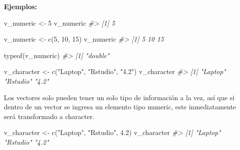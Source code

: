 \documentclass[
]{book}
\newenvironment{Shaded}{\begin{snugshade}}{\end{snugshade}}
\newcommand{\CommentTok}[1]{\textcolor[rgb]{0.56,0.35,0.01}{\textit{#1}}}
\newcommand{\DecValTok}[1]{\textcolor[rgb]{0.00,0.00,0.81}{#1}}
\newcommand{\FloatTok}[1]{\textcolor[rgb]{0.00,0.00,0.81}{#1}}
\newcommand{\FunctionTok}[1]{\textcolor[rgb]{0.00,0.00,0.00}{#1}}
\newcommand{\NormalTok}[1]{#1}
\newcommand{\OtherTok}[1]{\textcolor[rgb]{0.56,0.35,0.01}{#1}}
\newcommand{\StringTok}[1]{\textcolor[rgb]{0.31,0.60,0.02}{#1}}
\begin{document}
\textbf{Ejemplos:}

\begin{Shaded}
\begin{Highlighting}[]
\NormalTok{v\_numeric }\OtherTok{\textless{}{-}} \DecValTok{5}
\NormalTok{v\_numeric}
\CommentTok{\#\textgreater{} [1] 5}
\end{Highlighting}
\end{Shaded}

\begin{Shaded}
\begin{Highlighting}[]
\NormalTok{v\_numeric }\OtherTok{\textless{}{-}} \FunctionTok{c}\NormalTok{(}\DecValTok{5}\NormalTok{, }\DecValTok{10}\NormalTok{, }\DecValTok{15}\NormalTok{)}
\NormalTok{v\_numeric}
\CommentTok{\#\textgreater{} [1]  5 10 15}
\end{Highlighting}
\end{Shaded}

\begin{Shaded}
\begin{Highlighting}[]
\FunctionTok{typeof}\NormalTok{(v\_numeric)}
\CommentTok{\#\textgreater{} [1] "double"}
\end{Highlighting}
\end{Shaded}

\begin{Shaded}
\begin{Highlighting}[]
\NormalTok{v\_character }\OtherTok{\textless{}{-}} \FunctionTok{c}\NormalTok{(}\StringTok{"Laptop"}\NormalTok{, }\StringTok{"Rstudio"}\NormalTok{, }\StringTok{"4.2"}\NormalTok{)}
\NormalTok{v\_character}
\CommentTok{\#\textgreater{} [1] "Laptop"  "Rstudio" "4.2"}
\end{Highlighting}
\end{Shaded}

Los vectores solo pueden tener un solo tipo de información a la vez, así que si dentro de un vector se ingresa un elemento tipo numeric, este inmediatamente será transformado a character.

\begin{Shaded}
\begin{Highlighting}[]
\NormalTok{v\_character }\OtherTok{\textless{}{-}} \FunctionTok{c}\NormalTok{(}\StringTok{"Laptop"}\NormalTok{, }\StringTok{"Rstudio"}\NormalTok{, }\FloatTok{4.2}\NormalTok{)}
\NormalTok{v\_character}
\CommentTok{\#\textgreater{} [1] "Laptop"  "Rstudio" "4.2"}
\end{Highlighting}
\end{Shaded}
\end{document}
